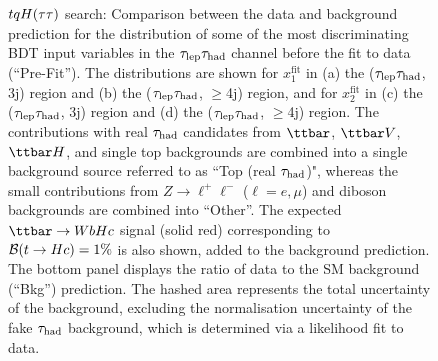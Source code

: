 \begin{figure}[t]
\begin{center}
\caption{$tqH(\tau\tau)$ search: Comparison between the data and background prediction for the distribution of some of the most
discriminating BDT input variables in the $\tau_{\mathrm{lep}} \tau_{\mathrm{had}}$ channel before the fit to data (``Pre-Fit''). The distributions are shown for
$x_{1}^{\text{fit}}$ in (a) the ($\tau_{\mathrm{lep}} \tau_{\mathrm{had}}$, 3j) region and (b) the ($\tau_{\mathrm{lep}} \tau_{\mathrm{had}}$, $\geq$4j) region, and for
$x_{2}^{\text{fit}}$ in (c) the ($\tau_{\mathrm{lep}} \tau_{\mathrm{had}}$, 3j)  region and (d) the ($\tau_{\mathrm{lep}} \tau_{\mathrm{had}}$, $\geq$4j) region.
The contributions with real $\tau_{\mathrm{had}}$ candidates from $\ttbar$,  $\ttbar V$, $\ttbar H$, and single top backgrounds are combined into
a single background source referred to as ``Top (real $\tau_{\mathrm{had}}$)", whereas the small contributions from 
$Z\to \ell^+\ell^-$ ($\ell = e, \mu$) and diboson backgrounds are combined into ``Other''. 
The expected $\Hc$ signal (solid red) corresponding to $\mathcal{B}(t\to Hc)=1\%$ is also shown,
added to the background prediction.
The bottom panel displays the ratio of data to the SM background (``Bkg'') prediction.
The hashed area represents the total uncertainty of the background, excluding the normalisation uncertainty of the fake $\tau_{\mathrm{had}}$ background, 
which is determined via a likelihood fit to data.}
\label{fig:BDT_inputs_lephad_2}
\end{center}
\end{figure}

